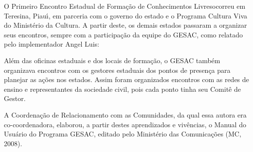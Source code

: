 \documentclass[
12pt,		%
openright,	%
twoside,  %
a4paper,			%
chapter=TITLE,		%
english,			%
french,				%
spanish,			%
brazil				%
]{USPSC-classe/USPSC}
\begin{document}
O \textquotedbl Primeiro Encontro Estadual de Forma\c{c}\~ao de Conhecimentos Livres\textquotedbl  ocorreu em  Teresina, Piau\'{\i}, em parceria com o governo do estado e o Programa Cultura Viva do Minist\'erio da Cultura. A partir deste, os demais estados passaram a organizar seus encontros, sempre com a participa\c{c}\~ao da equipe do GESAC, como relatado pelo implementador Angel Luis:


















\noindent\begin{center}\mbox{\centering{}}\end{center}


Al\'em das oficinas estaduais e dos locais de forma\c{c}\~ao, o GESAC tamb\'em organizava encontros com os gestores estaduais dos pontos de presen\c{c}a para planejar as a\c{c}\~oes nos estados. Assim foram organizados encontros com as redes de ensino e  representantes da sociedade civil, pois cada ponto  tinha seu Comit\^e de Gestor.

















A Coordena\c{c}\~ao de Relacionamento com as Comunidades, da qual essa autora era co-coordenadora, elaborou, a partir destes aprendizados e viv\^encias, o \textquotedbl Manual do Usu\'ario do Programa GESAC\textquotedbl , editado pelo Minist\'erio das Comunica\c{c}\~oes (MC, 2008).
\end{document}
